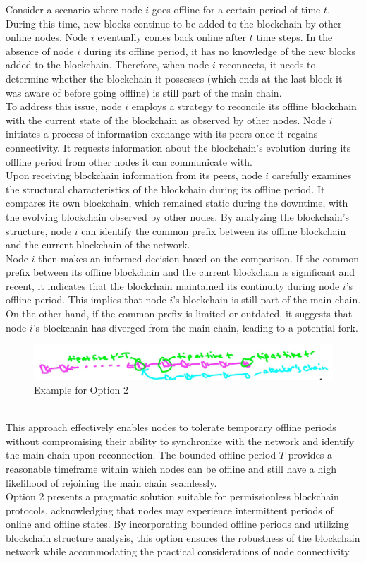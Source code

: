 Consider a scenario where node $i$ goes offline for a certain period of time $t$. During this time, new blocks continue to be added to the blockchain by other online nodes. Node $i$ eventually comes back online after $t$ time steps. In the absence of node $i$ during its offline period, it has no knowledge of the new blocks added to the blockchain. Therefore, when node $i$ reconnects, it needs to determine whether the blockchain it possesses (which ends at the last block it was aware of before going offline) is still part of the main chain.\\
To address this issue, node $i$ employs a strategy to reconcile its offline blockchain with the current state of the blockchain as observed by other nodes. Node $i$ initiates a process of information exchange with its peers once it regains connectivity. It requests information about the blockchain's evolution during its offline period from other nodes it can communicate with.\\
Upon receiving blockchain information from its peers, node $i$ carefully examines the structural characteristics of the blockchain during its offline period. It compares its own blockchain, which remained static during the downtime, with the evolving blockchain observed by other nodes. By analyzing the blockchain's structure, node $i$ can identify the common prefix between its offline blockchain and the current blockchain of the network.\\
Node $i$ then makes an informed decision based on the comparison. If the common prefix between its offline blockchain and the current blockchain is significant and recent, it indicates that the blockchain maintained its continuity during node $i$'s offline period. This implies that node $i$'s blockchain is still part of the main chain. On the other hand, if the common prefix is limited or outdated, it suggests that node $i$'s blockchain has diverged from the main chain, leading to a potential fork.\\
\begin{figure}[h]
    \centering
    \includegraphics[scale = 0.5]{figures/f61.png}
    \caption{Example for Option 2}
    \label{fig:mesh1}
\end{figure}\\
This approach effectively enables nodes to tolerate temporary offline periods without compromising their ability to synchronize with the network and identify the main chain upon reconnection. The bounded offline period $T$ provides a reasonable timeframe within which nodes can be offline and still have a high likelihood of rejoining the main chain seamlessly.\\
Option 2 presents a pragmatic solution suitable for permissionless blockchain protocols, acknowledging that nodes may experience intermittent periods of online and offline states. By incorporating bounded offline periods and utilizing blockchain structure analysis, this option ensures the robustness of the blockchain network while accommodating the practical considerations of node connectivity.

